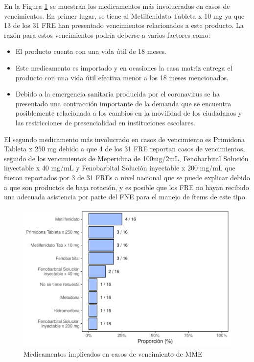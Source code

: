 \documentclass[
]{book}
\begin{document}
En la Figura \ref{fig:CasosVencimiento2} se muestran los medicamentos más involucrados en casos de vencimientos. En primer lugar, se tiene al Metilfenidato Tableta x 10 mg ya que 13 de los 31 FRE han presentado vencimientos relacionados a este producto. La razón para estos vencimientos podría deberse a varios factores como:

\begin{itemize}
\item
  El producto cuenta con una vida útil de 18 meses.
\item
  Este medicamento es importado y en ocasiones la casa matriz entrega el producto con una vida útil efectiva menor a los 18 meses mencionados.
\item
  Debido a la emergencia sanitaria producida por el coronavirus se ha presentado una contracción importante de la demanda que se encuentra posiblemente relacionada a los cambios en la movilidad de los ciudadanos y las restricciones de presencialidad en instituciones escolares.
\end{itemize}

El segundo medicamento más involucrado en casos de vencimiento es Primidona Tableta x 250 mg debido a que 4 de los 31 FRE reportan casos de vencimientos, seguido de los vencimientos de Meperidina de 100mg/2mL, Fenobarbital Solución inyectable x 40 mg/mL y Fenobarbital Solución inyectable x 200 mg/mL que fueron reportados por 3 de 31 FREs a nivel nacional que se puede explicar debido a que son productos de baja rotación, y es posible que los FRE no hayan recibido una adecuada asistencia por parte del FNE para el manejo de ítems de este tipo.

\begin{figure}
\includegraphics[width=0.85\linewidth]{InformeFinal_files/figure-latex/CasosVencimiento2-1} \caption{Medicamentos implicados en casos de vencimiento de MME}\label{fig:CasosVencimiento2}
\end{figure}
\end{document}
